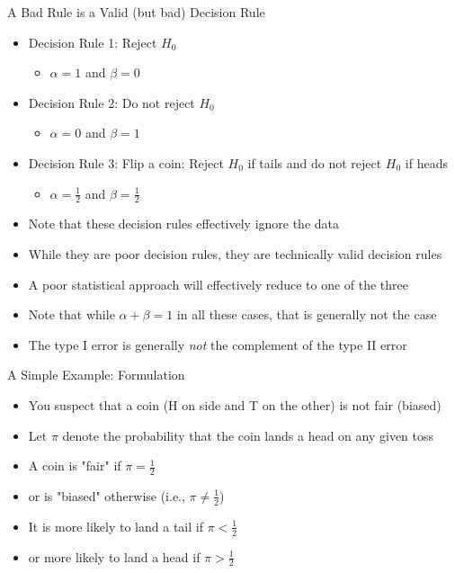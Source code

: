 \documentclass[xcolor=x11names,compress]{beamer}\usepackage[]{graphicx}\usepackage[]{color}
\begin{document}
\begin{frame}{A Bad Rule is a Valid (but bad) Decision Rule}
  \begin{itemize}
  \item Decision Rule 1: Reject $H_0$
    \begin{itemize}
    \item $\alpha=1$ and $\beta=0$ 
    \end{itemize}
  \item Decision Rule 2: Do not reject $H_0$
    \begin{itemize}
    \item  $\alpha=0$ and $\beta=1$ 
    \end{itemize}
  \item Decision Rule 3: Flip a coin: Reject $H_0$ if tails and do not reject $H_0$ if heads
    \begin{itemize}
    \item $\alpha=\frac{1}{2}$ and $\beta=\frac{1}{2}$ 
    \end{itemize}
  \item Note that these decision rules effectively ignore the data
  \item While they are poor decision rules, they are technically valid decision rules
  \item A poor statistical approach will effectively reduce to one of the three
  \item Note that while $\alpha+\beta=1$ in all these cases, that is generally not the case
  \item The type I error is generally {\it not} the complement of the type II error
  \end{itemize}
\end{frame}

\begin{frame}{A Simple Example: Formulation}

  \begin{itemize}
  \item You suspect that a coin (H on side and T on the other) 
         is not fair (biased)
  \item Let $\pi$ denote the probability that the coin lands a head on any given toss
  \item A coin is "fair" if $\pi=\frac{1}{2}$
  \item or is "biased" otherwise (i.e., $\pi\ne\frac{1}{2}$)
  \item It is more likely to land a tail if $\pi<\frac{1}{2}$
  \item or more likely to land a head if $\pi>\frac{1}{2}$
\end{itemize}
\end{frame}
\end{document}
